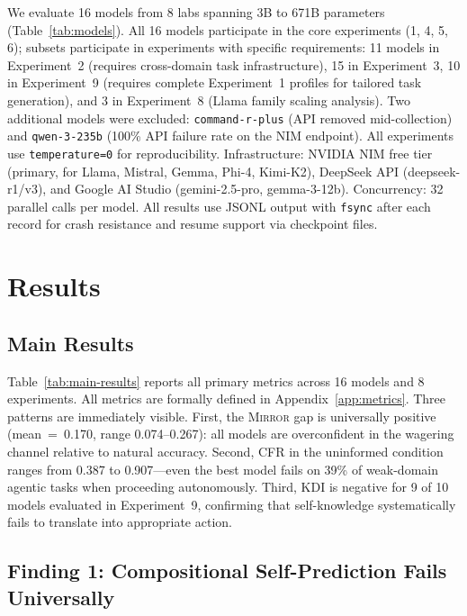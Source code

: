 \documentclass[10pt]{article}
\newcommand{\mirror}{\textsc{Mirror}}
\newcommand{\KDI}{KDI}
\newcommand{\CFR}{CFR}
\begin{document}
We evaluate 16 models from 8 labs spanning 3B to 671B parameters
(Table~\ref{tab:models}). All 16 models participate in the core experiments (1, 4, 5, 6); subsets participate in experiments with specific requirements: 11 models in Experiment~2 (requires cross-domain task infrastructure), 15 in Experiment~3, 10 in Experiment~9 (requires complete Experiment~1 profiles for tailored task generation), and 3 in Experiment~8 (Llama family scaling analysis). Two additional models were excluded:
\texttt{command-r-plus} (API removed mid-collection) and \texttt{qwen-3-235b}
(100\% API failure rate on the NIM endpoint). All experiments use
\texttt{temperature=0} for reproducibility. Infrastructure: NVIDIA NIM free tier
(primary, for Llama, Mistral, Gemma, Phi-4, Kimi-K2), DeepSeek API
(deepseek-r1/v3), and Google AI Studio (gemini-2.5-pro, gemma-3-12b).
Concurrency: 32 parallel calls per model. All results use JSONL output with
\texttt{fsync} after each record for crash resistance and resume support via
checkpoint files.

\section{Results}
\label{sec:results}

\subsection{Main Results}

Table~\ref{tab:main-results} reports all primary metrics across 16 models and 8
experiments. All metrics are formally defined in Appendix~\ref{app:metrics}. Three patterns are immediately visible. First, the \mirror{} gap is
universally positive (mean~=~0.170, range 0.074--0.267): all models are
overconfident in the wagering channel relative to natural accuracy. Second, \CFR{}
in the uninformed condition ranges from 0.387 to 0.907---even the best model fails
on 39\% of weak-domain agentic tasks when proceeding autonomously. Third, \KDI{}
is negative for 9 of 10 models evaluated in Experiment~9, confirming that
self-knowledge systematically fails to translate into appropriate action.



\subsection{Finding 1: Compositional Self-Prediction Fails Universally}
\end{document}
